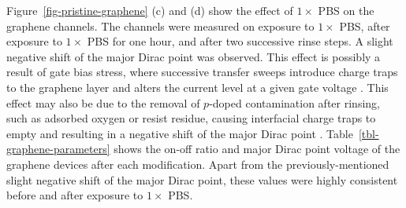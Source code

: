 \documentclass[
  a4paper,
]{scrbook}
\begin{document}
Figure~\ref{fig-pristine-graphene} (c) and (d) show the effect of
\(1 \times\) PBS on the graphene channels. The channels were measured on
exposure to \(1 \times\) PBS, after exposure to \(1 \times\) PBS for one
hour, and after two successive rinse steps. A slight negative shift of
the major Dirac point was observed. This effect is possibly a result of
gate bias stress, where successive transfer sweeps introduce charge
traps to the graphene layer and alters the current level at a given gate
voltage \autocite{Bargaoui2018,Noyce2019}. This effect may also be due
to the removal of \(p\)-doped contamination after rinsing, such as
adsorbed oxygen or resist residue, causing interfacial charge traps to
empty and resulting in a negative shift of the major Dirac point
\autocite{Bartolomeo2011,Kireev2017,Peng2018}.
Table~\ref{tbl-graphene-parameters} shows the on-off ratio and major
Dirac point voltage of the graphene devices after each modification.
Apart from the previously-mentioned slight negative shift of the major
Dirac point, these values were highly consistent before and after
exposure to \(1 \times\) PBS.
\end{document}
